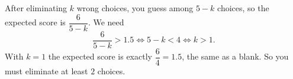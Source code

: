 After eliminating $k$ wrong choices, you guess among $5-k$ choices, so the expected score is $\dfrac{6}{5-k}$. We need
\[\dfrac6{5-k}>1.5\iff5-k<4\iff k>1.\]
With $k=1$ the expected score is exactly $\dfrac64=1.5$, the same as a blank. So you must eliminate at least $\boxed{2}$ choices.
